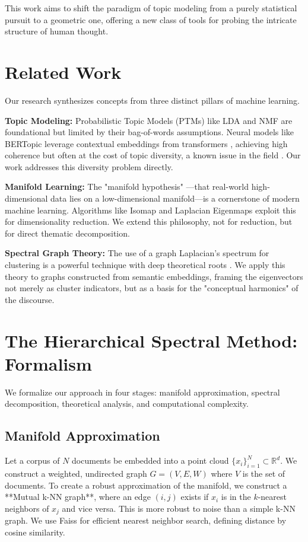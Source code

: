 \documentclass[conference]{IEEEtran}
\begin{document}
This work aims to shift the paradigm of topic modeling from a purely statistical pursuit to a geometric one, offering a new class of tools for probing the intricate structure of human thought.

\section{Related Work}
Our research synthesizes concepts from three distinct pillars of machine learning.

\textbf{Topic Modeling:} Probabilistic Topic Models (PTMs) like LDA \cite{blei2003latent} and NMF \cite{lee1999learning} are foundational but limited by their bag-of-words assumptions. Neural models like BERTopic \cite{grootendorst2022bertopic} leverage contextual embeddings from transformers \cite{reimers2019sentence}, achieving high coherence but often at the cost of topic diversity, a known issue in the field \cite{hoyle2021automated}. Our work addresses this diversity problem directly.

\textbf{Manifold Learning:} The "manifold hypothesis" \cite{fefferman2016testing}—that real-world high-dimensional data lies on a low-dimensional manifold—is a cornerstone of modern machine learning. Algorithms like Isomap \cite{tenenbaum2000global} and Laplacian Eigenmaps \cite{belkin2003laplacian} exploit this for dimensionality reduction. We extend this philosophy, not for reduction, but for direct thematic decomposition.

\textbf{Spectral Graph Theory:} The use of a graph Laplacian's spectrum for clustering is a powerful technique with deep theoretical roots \cite{von2007tutorial, ng2001spectral}. We apply this theory to graphs constructed from semantic embeddings, framing the eigenvectors not merely as cluster indicators, but as a basis for the "conceptual harmonics" of the discourse.

\section{The Hierarchical Spectral Method: Formalism}

We formalize our approach in four stages: manifold approximation, spectral decomposition, theoretical analysis, and computational complexity.

\subsection{Manifold Approximation}
Let a corpus of $N$ documents be embedded into a point cloud $\{x_i\}_{i=1}^N \subset \mathbb{R}^d$. We construct a weighted, undirected graph $G=(V, E, W)$ where $V$ is the set of documents. To create a robust approximation of the manifold, we construct a **Mutual k-NN graph**, where an edge $(i, j)$ exists if $x_i$ is in the $k$-nearest neighbors of $x_j$ and vice versa. This is more robust to noise than a simple k-NN graph. We use Faiss \cite{johnson2019billion} for efficient nearest neighbor search, defining distance by cosine similarity.
\end{document}
